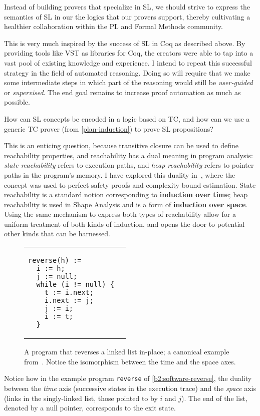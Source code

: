 \begin{proposal}
Instead of building provers that specialize in SL, we should strive to express the semantics of SL in our the logics that our provers support, thereby cultivating a healthier collaboration within the PL and Formal Methods community.
\end{proposal}

This is very much inspired by the success of SL in Coq as described above.
By providing tools like VST as libraries for Coq, the creators were able to tap into a vast pool of existing knowledge and experience.
I intend to repeat this successful strategy in the field of automated reasoning.
Doing so will require that we make some intermediate steps in which part of the reasoning would still be
\emph{user-guided} or \emph{supervised}.
The end goal remains to increase proof automation as much as possible.

\begin{researchquestion}
How can SL concepts be encoded in a logic based on TC,
and how can we use a generic TC prover (from \autoref{plan-induction})
to prove SL propositions?
\end{researchquestion}

This is an enticing question, because transitive closure can be used to define reachability properties,
and reachability has a dual meaning in program analysis: \emph{state reachability} refers to execution paths,
and \emph{heap reachability} refers to pointer paths in the program's memory.
I have explored this duality in~\cite{ESOP2021:Ish-Shalom},
where the concept was used to perfect safety proofs and complexity bound estimation.
State reachability is a standard notion corresponding to \textbf{induction over time};
heap reachability is used in Shape Analysis and is a form of \textbf{induction over space}.
Using the same mechanism to express both types of reachability allow for a uniform treatment of both kinds of induction, and opens the door to potential other kinds that can be harnessed.

\begin{figure}
\centering
\begin{tabular}{ll}
\begin{lstlisting}[basicstyle=\linespread{1.36}\ttfamily\fontsize{10pt}{8pt}\selectfont]
reverse(h) :=
  i := h;
  j := null;
  while (i != null) {
    t := i.next;
    i.next := j;
    j := i;
    i := t;
  }
\end{lstlisting}
&

\end{tabular}
\caption{A program that reverses a linked list in-place;
 a canonical example from~\cite{LICS2002:Reynolds}.
 Notice the isomorphism between the time and the space axes.
 }
\label{b2:software-reverse}
\end{figure}

Notice how in the example program \texttt{reverse}
of \autoref{b2:software-reverse},
the duality between the \emph{time} axis (successive states in the execution trace) and the \emph{space}
axis (links in the singly-linked list, \esp those pointed to by $i$ and $j$).
The end of the list, denoted by a null pointer,
corresponds to the exit state.
